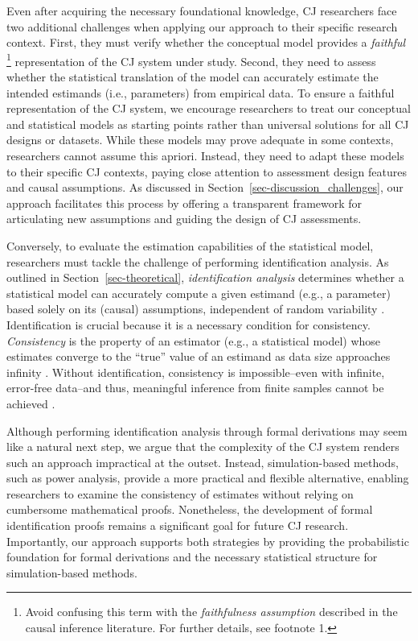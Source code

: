 \documentclass[
  authoryear,
  review,
  1p]{elsarticle}
\begin{document}
Even after acquiring the necessary foundational knowledge, CJ
researchers face two additional challenges when applying our approach to
their specific research context. First, they must verify whether the
conceptual model provides a \emph{faithful} \footnote{Avoid confusing
  this term with the \emph{faithfulness assumption}
  \citep{Neal_2020, Hernan_et_al_2025} described in the causal inference
  literature. For further details, see footnote 1.} representation of
the CJ system under study. Second, they need to assess whether the
statistical translation of the model can accurately estimate the
intended estimands (i.e., parameters) from empirical data. To ensure a
faithful representation of the CJ system, we encourage researchers to
treat our conceptual and statistical models as starting points rather
than universal solutions for all CJ designs or datasets. While these
models may prove adequate in some contexts, researchers cannot assume
this apriori. Instead, they need to adapt these models to their specific
CJ contexts, paying close attention to assessment design features and
causal assumptions. As discussed in
Section~\ref{sec-discussion_challenges}, our approach facilitates this
process by offering a transparent framework for articulating new
assumptions and guiding the design of CJ assessments.

Conversely, to evaluate the estimation capabilities of the statistical
model, researchers must tackle the challenge of performing
identification analysis. As outlined in Section~\ref{sec-theoretical},
\emph{identification analysis} determines whether a statistical model
can accurately compute a given estimand (e.g., a parameter) based solely
on its (causal) assumptions, independent of random variability
\citep{Schuessler_et_al_2023}. Identification is crucial because it is a
necessary condition for consistency. \emph{Consistency} is the property
of an estimator (e.g., a statistical model) whose estimates converge to
the ``true'' value of an estimand as data size approaches infinity
\citep{Everitt_et_al_2010}. Without identification, consistency is
impossible--even with infinite, error-free data--and thus, meaningful
inference from finite samples cannot be achieved
\citep{Schuessler_et_al_2023}.

Although performing identification analysis through formal derivations
may seem like a natural next step, we argue that the complexity of the
CJ system renders such an approach impractical at the outset. Instead,
simulation-based methods, such as power analysis, provide a more
practical and flexible alternative, enabling researchers to examine the
consistency of estimates without relying on cumbersome mathematical
proofs. Nonetheless, the development of formal identification proofs
remains a significant goal for future CJ research. Importantly, our
approach supports both strategies by providing the probabilistic
foundation for formal derivations and the necessary statistical
structure for simulation-based methods.
\end{document}
